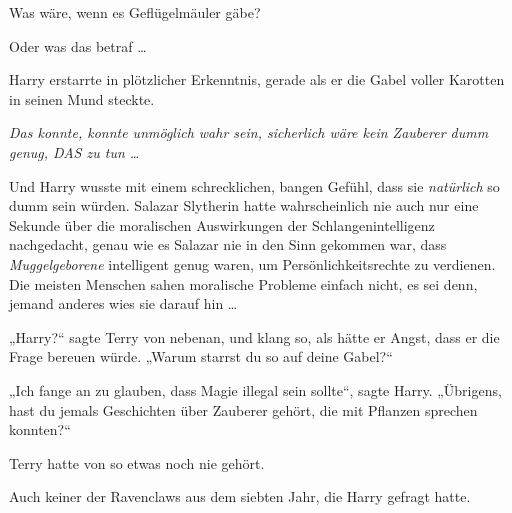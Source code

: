 Was wäre, wenn es Geflügelmäuler gäbe?

Oder was das betraf …

Harry erstarrte in plötzlicher Erkenntnis, gerade als er die Gabel voller Karotten in seinen Mund steckte.

\emph{Das konnte, konnte unmöglich wahr sein, sicherlich wäre kein Zauberer dumm genug, DAS zu tun …}

Und Harry wusste mit einem schrecklichen, bangen Gefühl, dass sie \emph{natürlich} so dumm sein würden. Salazar Slytherin hatte wahrscheinlich nie auch nur eine Sekunde über die moralischen Auswirkungen der Schlangenintelligenz nachgedacht, genau wie es Salazar nie in den Sinn gekommen war, dass \emph{Muggelgeborene} intelligent genug waren, um Persönlichkeitsrechte zu verdienen. Die meisten Menschen sahen moralische Probleme einfach nicht, es sei denn, jemand anderes wies sie darauf hin …

„Harry?“ sagte Terry von nebenan, und klang so, als hätte er Angst, dass er die Frage bereuen würde.
„Warum starrst du so auf deine Gabel?“

„Ich fange an zu glauben, dass Magie illegal sein sollte“, sagte Harry. „Übrigens, hast du jemals Geschichten über Zauberer gehört, die mit Pflanzen sprechen konnten?“

\later

Terry hatte von so etwas noch nie gehört.

Auch keiner der Ravenclaws aus dem siebten Jahr, die Harry gefragt hatte.

